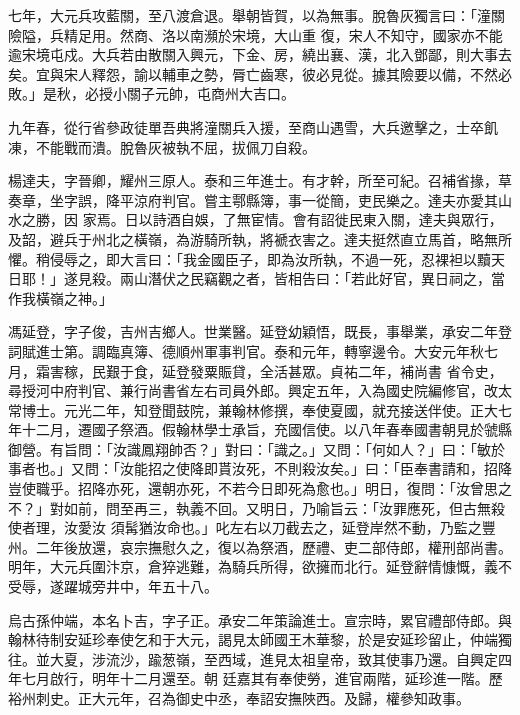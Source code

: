 \begin{pinyinscope}
 七年，大元兵攻藍關，至八渡倉退。舉朝皆賀，以為無事。脫魯灰獨言曰：「潼關險隘，兵精足用。然商、洛以南瀕於宋境，大山重
 復，宋人不知守，國家亦不能逾宋境屯戍。大兵若由散關入興元，下金、房，繞出襄、漢，北入鄧鄙，則大事去矣。宜與宋人釋怨，諭以輔車之勢，脣亡齒寒，彼必見從。據其險要以備，不然必敗。」是秋，必授小關子元帥，屯商州大吉口。



 九年春，從行省參政徒單吾典將潼關兵入援，至商山遇雪，大兵邀擊之，士卒飢凍，不能戰而潰。脫魯灰被執不屈，拔佩刀自殺。



 楊達夫，字晉卿，耀州三原人。泰和三年進士。有才幹，所至可紀。召補省掾，草奏章，坐字誤，降平涼府判官。嘗主鄠縣簿，事一從簡，吏民樂之。達夫亦愛其山水之勝，因
 家焉。日以詩酒自娛，了無宦情。會有詔徙民東入關，達夫與眾行，及韶，避兵于州北之橫嶺，為游騎所執，將褫衣害之。達夫挺然直立馬首，略無所懼。稍侵辱之，即大言曰：「我金國臣子，即為汝所執，不過一死，忍裸袒以黷天日耶！」遂見殺。兩山潛伏之民竊觀之者，皆相告曰：「若此好官，異日祠之，當作我橫嶺之神。」



 馮延登，字子俊，吉州吉鄉人。世業醫。延登幼穎悟，既長，事舉業，承安二年登詞賦進士第。調臨真簿、德順州軍事判官。泰和元年，轉寧邊令。大安元年秋七月，霜害稼，民艱于食，延登發粟賑貸，全活甚眾。貞祐二年，補尚書
 省令史，尋授河中府判官、兼行尚書省左右司員外郎。興定五年，入為國史院編修官，改太常博士。元光二年，知登聞鼓院，兼翰林修撰，奉使夏國，就充接送伴使。正大七年十二月，遷國子祭酒。假翰林學士承旨，充國信使。以八年春奉國書朝見於虢縣御營。有旨問：「汝識鳳翔帥否？」對曰：「識之。」又問：「何如人？」曰：「敏於事者也。」又問：「汝能招之使降即貰汝死，不則殺汝矣。」曰：「臣奉書請和，招降豈使職乎。招降亦死，還朝亦死，不若今日即死為愈也。」明日，復問：「汝曾思之不？」對如前，問至再三，執義不回。又明日，乃喻旨云：「汝罪應死，但古無殺使者理，汝愛汝
 須髯猶汝命也。」叱左右以刀截去之，延登岸然不動，乃監之豐州。二年後放還，哀宗撫慰久之，復以為祭酒，歷禮、吏二部侍郎，權刑部尚書。明年，大元兵圍汴京，倉猝逃難，為騎兵所得，欲擁而北行。延登辭情慷慨，義不受辱，遂躍城旁井中，年五十八。



 烏古孫仲端，本名卜吉，字子正。承安二年策論進士。宣宗時，累官禮部侍郎。與翰林待制安延珍奉使乞和于大元，謁見太師國王木華黎，於是安延珍留止，仲端獨往。並大夏，涉流沙，踰葱嶺，至西域，進見太祖皇帝，致其使事乃還。自興定四年七月啟行，明年十二月還至。朝
 廷嘉其有奉使勞，進官兩階，延珍進一階。歷裕州刺史。正大元年，召為御史中丞，奉詔安撫陜西。及歸，權參知政事。




\end{pinyinscope}
